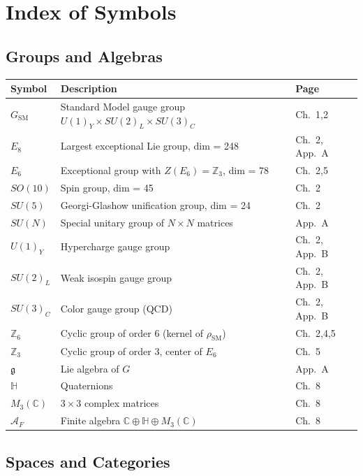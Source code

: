 \documentclass[11pt,a4paper,openright]{book}
\theoremstyle{plain}
\theoremstyle{definition}
\begin{document}
\chapter*{Index of Symbols}

\section*{Groups and Algebras}

\begin{tabular}{lll}
\textbf{Symbol} & \textbf{Description} & \textbf{Page} \\
\hline
$G_{\mathrm{SM}}$ & Standard Model gauge group $U(1)_Y \times SU(2)_L \times SU(3)_C$ & Ch.~1,2 \\
$E_8$ & Largest exceptional Lie group, dim = 248 & Ch.~2, App.~A \\
$E_6$ & Exceptional group with $Z(E_6) = \mathbb{Z}_3$, dim = 78 & Ch.~2,5 \\
$SO(10)$ & Spin group, dim = 45 & Ch.~2 \\
$SU(5)$ & Georgi-Glashow unification group, dim = 24 & Ch.~2 \\
$SU(N)$ & Special unitary group of $N \times N$ matrices & App.~A \\
$U(1)_Y$ & Hypercharge gauge group & Ch.~2, App.~B \\
$SU(2)_L$ & Weak isospin gauge group & Ch.~2, App.~B \\
$SU(3)_C$ & Color gauge group (QCD) & Ch.~2, App.~B \\
$\mathbb{Z}_6$ & Cyclic group of order 6 (kernel of $\rho_{\mathrm{SM}}$) & Ch.~2,4,5 \\
$\mathbb{Z}_3$ & Cyclic group of order 3, center of $E_6$ & Ch.~5 \\
$\mathfrak{g}$ & Lie algebra of $G$ & App.~A \\
$\mathbb{H}$ & Quaternions & Ch.~8 \\
$M_3(\mathbb{C})$ & $3 \times 3$ complex matrices & Ch.~8 \\
$\mathcal{A}_F$ & Finite algebra $\mathbb{C} \oplus \mathbb{H} \oplus M_3(\mathbb{C})$ & Ch.~8 \\
\end{tabular}

\section*{Spaces and Categories}
\end{document}
